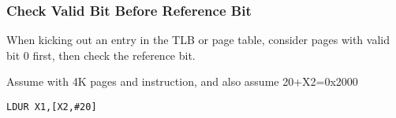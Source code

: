 {%
\begin{frame}[fragile]\frametitle{Check Valid Bit Before Reference Bit}
When kicking out an entry in the TLB or page table, consider pages with valid bit 0 first, then check the reference bit.
\end{frame}
}\fi


\newpage
\begin{frame}[fragile]
\begin{tcolorbox}[enhanced,attach boxed title to top center={yshift=-3mm,yshifttext=-1mm},
  colback=blue!5!white,colframe=blue!75!black,colbacktitle=blue!80!black,
  title=Think About It,fonttitle=\bfseries,
  boxed title style={size=small,colframe=red!50!black} ]
  
{\footnotesize
Assume with 4K pages and instruction, and also assume 20+X2=0x2000

\texttt{LDUR X1,[X2,\#20]}

}
\end{tcolorbox}
\end{frame}
